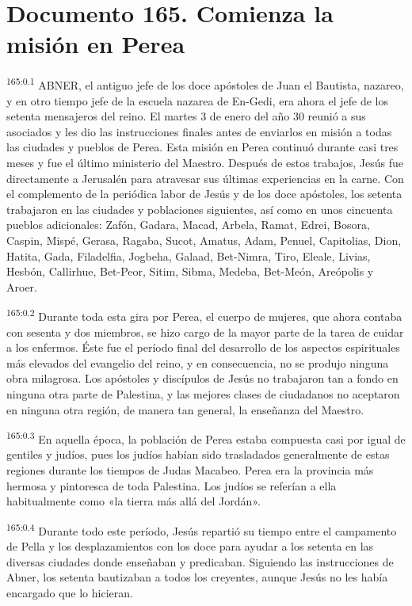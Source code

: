 \chapter{Documento 165. Comienza la misión en Perea}
\par
\textsuperscript{165:0.1} ABNER, el antiguo jefe de los doce apóstoles de Juan el Bautista, nazareo, y en otro tiempo jefe de la escuela nazarea de En-Gedi, era ahora el jefe de los setenta mensajeros del reino. El martes 3 de enero del año 30 reunió a sus asociados y les dio las instrucciones finales antes de enviarlos en misión a todas las ciudades y pueblos de Perea. Esta misión en Perea continuó durante casi tres meses y fue el último ministerio del Maestro. Después de estos trabajos, Jesús fue directamente a Jerusalén para atravesar sus últimas experiencias en la carne. Con el complemento de la periódica labor de Jesús y de los doce apóstoles, los setenta trabajaron en las ciudades y poblaciones siguientes, así como en unos cincuenta pueblos adicionales: Zafón, Gadara, Macad, Arbela, Ramat, Edrei, Bosora, Caspin, Mispé, Gerasa, Ragaba, Sucot, Amatus, Adam, Penuel, Capitolias, Dion, Hatita, Gada, Filadelfia, Jogbeha, Galaad, Bet-Nimra, Tiro, Eleale, Livias, Hesbón, Callirhue, Bet-Peor, Sitim, Sibma, Medeba, Bet-Meón, Areópolis y Aroer.

\par
\textsuperscript{165:0.2} Durante toda esta gira por Perea, el cuerpo de mujeres, que ahora contaba con sesenta y dos miembros, se hizo cargo de la mayor parte de la tarea de cuidar a los enfermos. Éste fue el período final del desarrollo de los aspectos espirituales más elevados del evangelio del reino, y en consecuencia, no se produjo ninguna obra milagrosa. Los apóstoles y discípulos de Jesús no trabajaron tan a fondo en ninguna otra parte de Palestina, y las mejores clases de ciudadanos no aceptaron en ninguna otra región, de manera tan general, la enseñanza del Maestro.

\par
\textsuperscript{165:0.3} En aquella época, la población de Perea estaba compuesta casi por igual de gentiles y judíos, pues los judíos habían sido trasladados generalmente de estas regiones durante los tiempos de Judas Macabeo. Perea era la provincia más hermosa y pintoresca de toda Palestina. Los judíos se referían a ella habitualmente como «la tierra más allá del Jordán».

\par
\textsuperscript{165:0.4} Durante todo este período, Jesús repartió su tiempo entre el campamento de Pella y los desplazamientos con los doce para ayudar a los setenta en las diversas ciudades donde enseñaban y predicaban. Siguiendo las instrucciones de Abner, los setenta bautizaban a todos los creyentes, aunque Jesús no les había encargado que lo hicieran.

